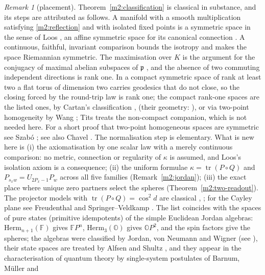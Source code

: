 \documentclass[11pt,reqno]{amsart}
\theoremstyle{definition}
\theoremstyle{remark}
\newtheorem{remark}[theorem]{Remark}
\numberwithin{equation}{section}
\begin{document}
\begin{remark}[placement]\label{m2:placement}
Theorem~\ref{m2:classification} is classical in substance, and its steps are attributed as follows.  A manifold with a smooth multiplication
satisfying \eqref{m2:reflection} and with isolated fixed points is a symmetric space in the sense of Loos \cite[Ch.~II, \S1]{Loos}, an
affine symmetric space for its canonical connection \cite[Ch.~II, \S2]{Loos}.  A continuous, faithful, invariant comparison bounds the
isotropy and makes the space Riemannian symmetric.  The maximisation over $K$ is the argument for the conjugacy of maximal abelian
subspaces of $\mathfrak p$ \cite[Ch.~V, \S6]{Helgason}, and the absence of two commuting independent directions is rank one.  In a compact
symmetric space of rank at least two a flat torus of dimension two carries geodesics that do not close, so the closing forced by the
round-trip law is rank one; the compact rank-one spaces are the listed ones, by Cartan's
classification \cite{Cartan26,Cartan27}, \cite[Ch.~X]{Helgason} (their geometry: \cite[Ch.~3]{Besse78}), or via two-point homogeneity by
Wang \cite{Wang52}; Tits \cite{Tits55} treats the non-compact companion, which is not needed here.  For a short proof that two-point
homogeneous spaces are symmetric see Szab\'o \cite{m2:Szabo}; see also Chavel \cite{m2:Chavel}.  The normalisation step is elementary.  What is new here is (i) the axiomatisation by one scalar law with a merely
continuous comparison: no metric, connection or regularity of $\kappa$ is assumed, and Loos's isolation axiom is a consequence;
(ii) the uniform formulae $\kappa=\operatorname{tr}(P\circ Q)$ and $P_{s_xw}=U_{2P_x-1}P_w$ across all five families
(Remark~\ref{m2:jordan}); (iii) the exact place where unique zero partners select the spheres (Theorem~\ref{m2:two-readout}).  The projector
models with $\operatorname{tr}(P\circ Q)=\cos^2d$ are classical \cite{m2:Tai}, \cite[Ch.~3]{Besse78}; for the Cayley plane see Freudenthal
\cite{m2:Freudenthal} and Springer--Veldkamp \cite{SV00}.  The list coincides
with the spaces of pure states (primitive idempotents) of the simple Euclidean Jordan algebras: $\mathrm{Herm}_{n+1}(\mathbb F)$ gives
$\mathbb FP^n$, $\mathrm{Herm}_3(\mathbb O)$ gives $\mathbb OP^2$, and the spin factors give the spheres; the algebras were classified by
Jordan, von Neumann and Wigner \cite{m2:JNW} (see \cite[Ch.~V]{m2:FK}), their state spaces are treated by Alfsen and Shultz
\cite{m2:AlfsenShultz}, and they appear in the characterisation of quantum theory by single-system postulates of Barnum, M\"uller and

\end{remark}
\end{document}
